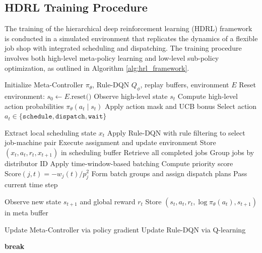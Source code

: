 \documentclass{article}
\begin{document}
\subsection{HDRL Training Procedure}
The training of the hierarchical deep reinforcement learning (HDRL) framework is conducted in a simulated environment that replicates the dynamics of a flexible job shop with integrated scheduling and dispatching. The training procedure involves both high-level meta-policy learning and low-level sub-policy optimization, as outlined in Algorithm \ref{alg:hrl_framework}.

\begin{algorithm}[H]
\caption{Hierarchical Scheduling and Dispatching Framework}
\label{alg:hrl_framework}
\begin{algorithmic}[1]
\State Initialize Meta-Controller $\pi_\theta$, Rule-DQN $Q_\phi$, replay buffers, environment $E$
    \State Reset environment: $s_0 \gets E.\text{reset()}$
        \State Observe high-level state $s_t$
        \State Compute high-level action probabilities $\pi_\theta(a_t \mid s_t)$
        \State Apply action mask and UCB bonus
        \State Select action $a_t \in \{\texttt{schedule}, \texttt{dispatch}, \texttt{wait}\}$

                \State Extract local scheduling state $x_t$
                \State Apply Rule-DQN with rule filtering to select job-machine pair
                \State Execute assignment and update environment
                \State Store $(x_t, a_t, r_t, x_{t+1})$ in scheduling buffer
            \EndWhile
            \State Retrieve all completed jobs
            \State Group jobs by distributor ID
                \State Apply time-window-based batching
                \State Compute priority score $\text{Score}(j, t) = -w_j(t)/p_j^2$
                \State Form batch groups and assign dispatch plans
            \EndFor
        \Else 
            \State Pass current time step
        \EndIf

        \State Observe new state $s_{t+1}$ and global reward $r_t$
        \State Store $(s_t, a_t, r_t, \log \pi_\theta(a_t), s_{t+1})$ in meta buffer

            \State Update Meta-Controller via policy gradient
            \State Update Rule-DQN via Q-learning
        \EndIf

            \State \textbf{break}
        \EndIf
    \EndFor
\EndFor
\end{algorithmic}
\end{algorithm}
\end{document}
